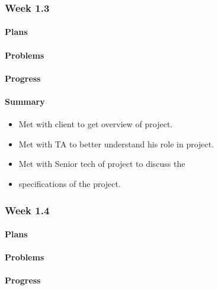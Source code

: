 \documentclass[onecolumn, draftclsnofoot,10pt, compsoc]{article}
\begin{document}
		\subsubsection{Week 1.3}

		    \paragraph{Plans} \hfill \break

		    \paragraph{Problems} \hfill \break

		    \paragraph{Progress} \hfill \break

		    \paragraph{Summary} \hfill \break
		    	\begin{itemize}
		        \item Met with client to get overview of project.
                \item Met with TA to better understand his role in project.
                \item Met with Senior tech of project to discuss the \item specifications of the project.
                \end{itemize}

		\subsubsection{Week 1.4}
			\paragraph{Plans} \hfill \break

		    \paragraph{Problems} \hfill \break

		    \paragraph{Progress} \hfill \break
\end{document}
